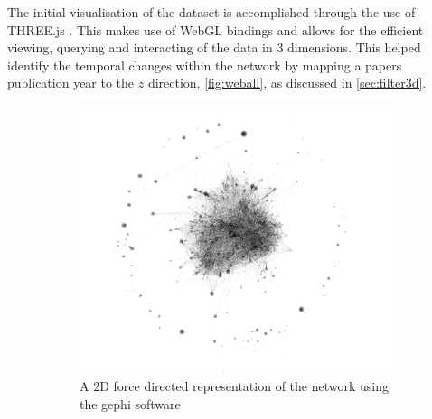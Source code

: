 The initial visualisation of the dataset is accomplished through the use of THREE.js \citep{threejs}. This makes use of WebGL bindings and allows for the efficient viewing, querying and interacting of the data in 3 dimensions. This helped identify the temporal changes within the network by mapping a papers publication year to the $z$ direction, \autoref{fig:weball}, as discussed in \autoref{sec:filter3d}.

\begin{figure}[] %
     \centering
     \hfill
     \begin{subfigure}{0.495\textwidth}
         \centering
         \includegraphics[width=\textwidth]{figures_c3/gephiall.png}
         \caption{A 2D force directed representation of the network using the gephi software \citep{gephi}}
         \label{fig:gall}
     \end{subfigure}
     \hfill
     \begin{subfigure}{0.47\textwidth}
         \centering

\end{subfigure}
\end{figure}
